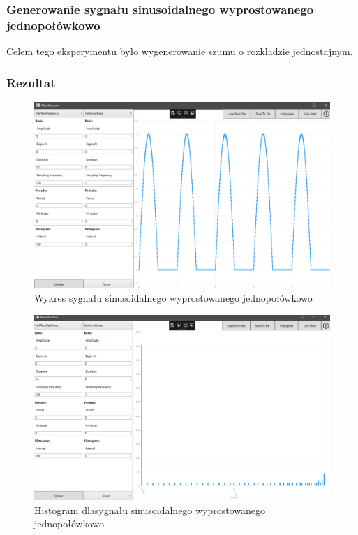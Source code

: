 \documentclass[12pt]{article}
\begin{document}
\subsubsection{Generowanie sygnału sinusoidalnego wyprostowanego jednopołówkowo}
Celem tego eksperymentu było wygenerowanie szumu o rozkladzie jednostajnym.


\subsubsection{Rezultat}

\begin{figure}[H]
 \centering
 \includegraphics[width=14cm]{images/half1.PNG}
 \vspace{-0.3cm}
 \caption{Wykres sygnału sinusoidalnego wyprostowanego jednopołówkowo}
 \label{gui}
\end{figure}

\begin{figure}[H]
 \centering
 \includegraphics[width=14cm]{images/half1hist.PNG}
 \vspace{-0.3cm}
 \caption{Histogram dlasygnału sinusoidalnego wyprostowanego jednopołówkowo}
 \label{gui}
\end{figure}
\end{document}
